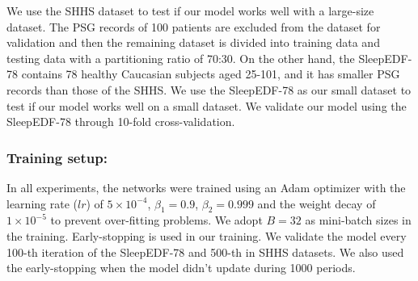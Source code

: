 We use the SHHS dataset to test if our model works well with a large-size dataset. The PSG records of 100 patients are excluded from the dataset for validation and then the remaining dataset is divided into training data and testing data with a partitioning ratio of 70:30. 
%
On the other hand, the SleepEDF-78 contains 78 healthy Caucasian subjects aged 25-101, and it has smaller PSG records than those of the SHHS.
We use the SleepEDF-78 as our small dataset to test if our model works well on a small dataset. We validate our model using the SleepEDF-78 through 10-fold cross-validation. %



\subsubsection{Training setup:} In all experiments, the networks were trained using an Adam optimizer \cite{kingma2017adam} with the learning rate ($lr$) of $5 \times 10^{-4}$, $\beta_1 = 0.9$, $\beta_2 = 0.999$ and the weight decay of $1 \times 10^{-5}$ to prevent over-fitting problems. We adopt $B=32$ as mini-batch sizes in the training. Early-stopping is used in our training.
We validate the model every 100-th iteration of the SleepEDF-78 and 500-th in SHHS datasets. We also used the early-stopping when the model didn't update during 1000 periods.%

